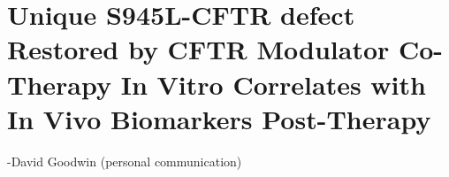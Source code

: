 \chapter{Unique S945L-CFTR defect Restored by CFTR Modulator Co-Therapy In Vitro Correlates with In Vivo Biomarkers Post-Therapy}
 {-David Goodwin (personal communication)}
\label{chap:s945l}
